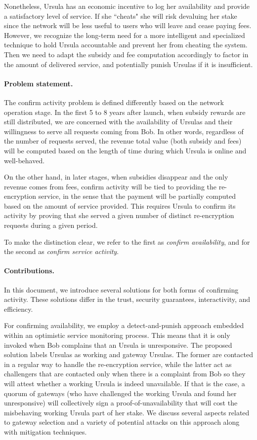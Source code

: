 Nonetheless, Ursula has an economic incentive to log her availability and provide a satisfactory level of service. If she ``cheats" she will risk devaluing her stake since the network will be less useful to users who will leave and cease paying fees. However, we recognize the long-term need for a more intelligent and specialized technique to hold Ursula accountable and prevent her from cheating the system. Then we need to adapt the subsidy and fee computation accordingly to factor in the amount of delivered service, and potentially punish Ursulas if it is insufficient.


\paragraph{\bf Problem statement.}
The confirm activity problem is defined differently based on the network operation stage. In the first 5 to 8 years after launch, when subsidy rewards are still distributed, we are concerned with the availability of Ursulas and their willingness to serve all requests coming from Bob. In other words, regardless of the number of requests served, the revenue total value (both subsidy and fees) will be computed based on the length of time during which Ursula is online and well-behaved. 


On the other hand, in later stages, when subsidies disappear and the only revenue comes from fees, confirm activity will be tied to providing the re-encryption service, in the sense that the payment will be partially computed based on the amount of service provided. This requires Ursula to confirm its activity by proving that she served a given number of distinct re-encryption requests during a given period. 


To make the distinction clear, we refer to the first as \emph{confirm availability}, and for the second as \emph{confirm service activity}.


\paragraph{\bf Contributions.}
In this document, we introduce several solutions for both forms of confirming activity. These solutions differ in the trust, security guarantees, interactivity, and efficiency. 


For confirming availability, we employ a detect-and-punish approach embedded within an optimistic service monitoring process. This means that it is only invoked when Bob complains that an Ursula is unresponsive. The proposed solution labels Ursulas as working and gateway Ursulas. The former are contacted in a regular way to handle the re-encryption service, while the latter act as challengers that are contacted only when there is a complaint from Bob so they will attest whether a working Ursula is indeed unavailable. If that is the case, a quorum of gateways (who have challenged the working Ursula and found her unresponsive) will collectively sign a proof-of-unavailability that will cost the misbehaving working Ursula part of her stake. We discuss several aspects related to gateway selection and a variety of potential attacks on this approach along with mitigation techniques.


